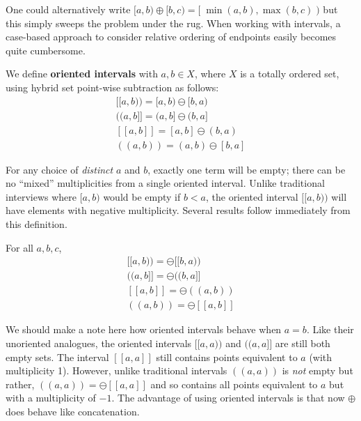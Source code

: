 One could alternatively write $[a,b)\oplus [b,c) = [\; \min(a,b),\max(b,c) \;)$ but this simply sweeps the problem 
under the rug.
When working with intervals, a case-based approach to consider relative ordering of endpoints easily becomes 
quite cumbersome.


\begin{definition}
	We define \textbf{oriented intervals} with $a,b\in X$, where $X$ is a totally ordered set, 
	using hybrid set point-wise subtraction as follows:
	\begin{equation}
		\begin{array}{cc}
			{[\![ a,b )\!)} = [a,b) \ominus [b,a) \\
			{(\!( a,b ]\!]} = (a,b] \ominus (b,a] \\
			{[\![ a,b ]\!]} = [a,b] \ominus (b,a) \\
			{(\!( a,b )\!)} = (a,b) \ominus [b,a]
		\end{array}
	\end{equation}
\end{definition}


For any choice of \emph{distinct} $a$ and $b$, exactly one term will be empty; there can be no ``mixed'' multiplicities from a single oriented interval.
Unlike traditional interviews where $[a,b)$ would be empty if $b < a$,  
the oriented interval $[\![a,b)\!)$ will have elements with negative multiplicity.
Several results follow immediately from this definition.

\begin{theorem} For all $a,b,c$, 
	\begin{equation}
		\begin{array}{cc}
		{[\![a,b)\!)} = \ominus [\![b,a)\!) \\
		{(\!(a,b]\!]} = \ominus (\!(b,a]\!] \\
		{[\![a,b]\!]} = \ominus (\!(a,b)\!) \\
		{(\!(a,b)\!)} = \ominus [\![a,b]\!]
		\end{array}
	\end{equation}
\end{theorem}


We should make a note here how oriented intervals behave when $a=b$.
Like their unoriented analogues, the oriented intervals $[\![ a,a )\!)$ and $(\!( a,a ]\!]$ are still both empty sets.
The interval $[\![a,a]\!]$ still contains points equivalent to $a$ (with multiplicity 1).
However, unlike traditional intervals $(\!(a,a)\!)$ is \emph{not} empty but rather, $(\!(a,a)\!) = \ominus [\![a,a]\!]$ and so contains all points equivalent to $a$ but with a multiplicity of $-1$.
The advantage of using oriented intervals is that now $\oplus$ does behave like concatenation.


